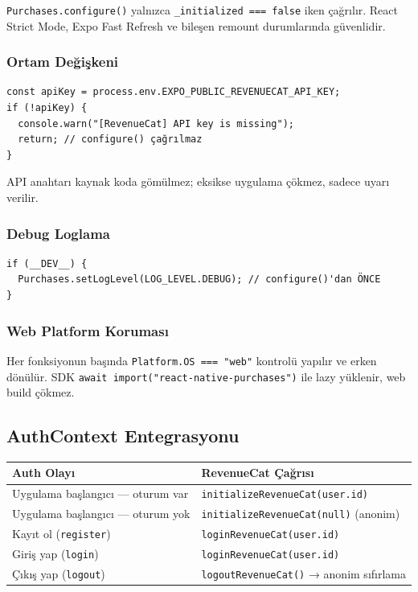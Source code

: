 \documentclass[12pt,a4paper]{article}
\begin{document}
\texttt{Purchases.configure()} yalnızca \texttt{\_initialized === false} iken çağrılır.
React Strict Mode, Expo Fast Refresh ve bileşen remount durumlarında güvenlidir.

\subsubsection{Ortam Değişkeni}

\begin{lstlisting}[language={}]
const apiKey = process.env.EXPO_PUBLIC_REVENUECAT_API_KEY;
if (!apiKey) {
  console.warn("[RevenueCat] API key is missing");
  return; // configure() çağrılmaz
}
\end{lstlisting}

API anahtarı kaynak koda gömülmez; eksikse uygulama çökmez, sadece uyarı verilir.

\subsubsection{Debug Loglama}

\begin{lstlisting}[language={}]
if (__DEV__) {
  Purchases.setLogLevel(LOG_LEVEL.DEBUG); // configure()'dan ÖNCE
}
\end{lstlisting}

\subsubsection{Web Platform Koruması}

Her fonksiyonun başında \texttt{Platform.OS === "web"} kontrolü yapılır ve erken dönülür.
SDK \texttt{await import("react-native-purchases")} ile lazy yüklenir, web build çökmez.

\subsection{AuthContext Entegrasyonu}

\begin{center}
\begin{tabular}{ll}
  \toprule
  \textbf{Auth Olayı} & \textbf{RevenueCat Çağrısı}\\
  \midrule
  Uygulama başlangıcı — oturum var & \texttt{initializeRevenueCat(user.id)}\\
  Uygulama başlangıcı — oturum yok & \texttt{initializeRevenueCat(null)} (anonim)\\
  Kayıt ol (\texttt{register}) & \texttt{loginRevenueCat(user.id)}\\
  Giriş yap (\texttt{login}) & \texttt{loginRevenueCat(user.id)}\\
  Çıkış yap (\texttt{logout}) & \texttt{logoutRevenueCat()} → anonim sıfırlama\\
  \bottomrule
\end{tabular}
\end{center}
\end{document}
